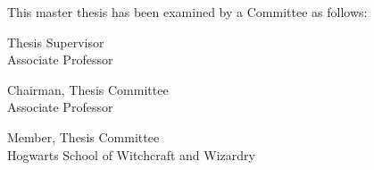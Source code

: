 
\begin{titlepage}
\begin{large}
This master thesis has been examined by a Committee as follows:

\signature{Professor Silvio de Barros Melo}{Thesis Supervisor \\
   Associate Professor}

\signature{Professor Veronica Teichrieb}{Chairman, Thesis Committee \\
   Associate Professor}

\signature{Professor Alvo Dumbledore}{Member, Thesis Committee \\
   Hogwarts School of Witchcraft and Wizardry}
\end{large}
\end{titlepage}

